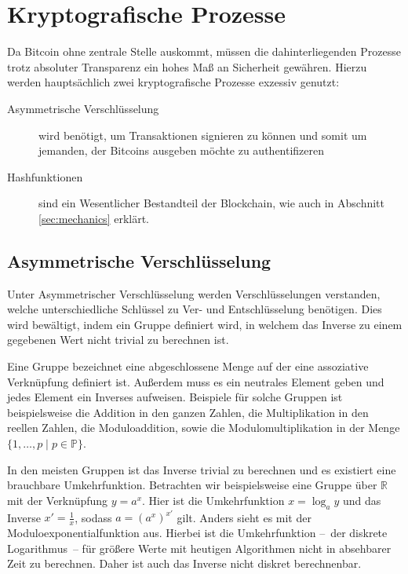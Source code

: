 \section{Kryptografische Prozesse}

Da Bitcoin ohne zentrale Stelle auskommt, müssen die dahinterliegenden Prozesse trotz absoluter Transparenz ein hohes Maß an Sicherheit gewähren.
Hierzu werden hauptsächlich zwei kryptografische Prozesse exzessiv genutzt:
\begin{description}
    \item[Asymmetrische Verschlüsselung] wird benötigt, um Transaktionen signieren zu können und somit um jemanden, der Bitcoins ausgeben möchte zu authentifizeren
    \item[Hashfunktionen] sind ein Wesentlicher Bestandteil der Blockchain, wie auch in Abschnitt \ref{sec:mechanics} erklärt.
\end{description}

\subsection{Asymmetrische Verschlüsselung}

Unter Asymmetrischer Verschlüsselung werden Verschlüsselungen verstanden, welche unterschiedliche Schlüssel zu Ver- und Entschlüsselung benötigen.
Dies wird bewältigt, indem ein Gruppe definiert wird, in welchem das Inverse zu einem gegebenen Wert nicht trivial zu berechnen ist.

Eine Gruppe bezeichnet eine abgeschlossene Menge auf der eine assoziative Verknüpfung definiert ist.
Außerdem muss es ein neutrales Element geben und jedes Element ein Inverses aufweisen. 
Beispiele für solche Gruppen ist beispielsweise die Addition in den ganzen Zahlen, die Multiplikation in den reellen Zahlen, die Moduloaddition, sowie die Modulomultiplikation in der Menge $\{ 1, \dotsc, p \mid p \in \mathbb{P}\}$.

In den meisten Gruppen ist das Inverse trivial zu berechnen und es existiert eine brauchbare Umkehrfunktion.
Betrachten wir beispielsweise eine Gruppe über $\mathbb{R}$ mit der Verknüpfung $y=a^x$.
Hier ist die Umkehrfunktion $x=\log_a y$ und das Inverse $x'=\frac{1}{x}$, sodass $a=(a^x)^{x'}$ gilt.
Anders sieht es mit der Moduloexponentialfunktion aus.
Hierbei ist die Umkehrfunktion --~der diskrete Logarithmus~-- für größere Werte mit heutigen Algorithmen nicht in absehbarer Zeit zu berechnen.
Daher ist auch das Inverse nicht diskret berechnenbar. 

